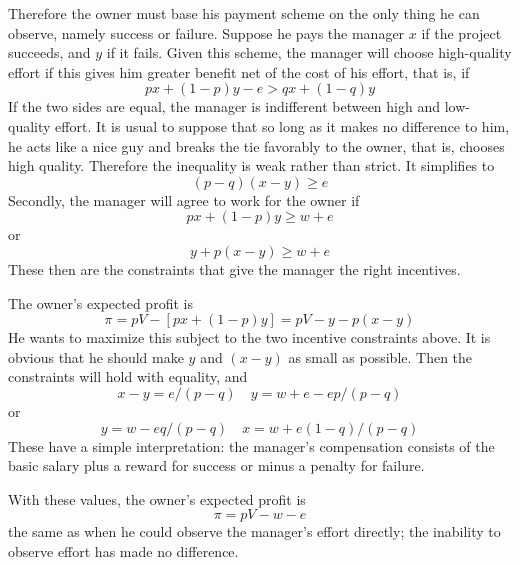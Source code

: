 Therefore the owner must base his payment scheme on the only thing he can observe, namely success or failure. Suppose he pays the manager $x$ if the project succeeds, and $y$ if it fails. Given this scheme, the manager will choose high-quality effort if this gives him greater benefit net of the cost of his effort, that is, if 
\begin{equation*}
px + (1-p)y -e > qx + (1-q)y 
\end{equation*}
If the two sides are equal, the manager is indifferent between high and low-quality effort. It is usual to suppose that so long as it makes no difference to him, he acts like a nice guy and breaks the tie favorably to the owner, that is, chooses high quality. Therefore the inequality is weak rather than strict. It simplifies to 
\begin{equation} \label{equa9.17}
(p-q) (x-y) \geq e
\end{equation}
Secondly, the manager will agree to work for the owner if 
\begin{equation*}
px + (1-p)y \geq w + e
\end{equation*}
or 
\begin{equation} \label{equa9.18}
 y + p(x-y) \geq w+e
\end{equation}
These then are the constraints that give the manager the right incentives.

The owner's expected profit is 
\begin{equation} \label{equa9.19}
\pi = pV - [  px + (1-p)y  ] = pV -y -p(x-y)
\end{equation}
He wants to maximize this subject to the two incentive constraints above. It is obvious that he should make $y$ and $(x-y)$ as small as possible. Then the constraints will hold with equality, and 
\begin{equation*} 
 x-y = e/(p-q) \quad y =w+e - ep/(p-q)
\end{equation*}
or
\begin{equation} \label{equa9.20}
 y = w -e q/(p-q) \quad  x = w +e (1-q)/(p-q)
\end{equation}
These have a simple interpretation: the manager's compensation consists of the basic salary plus a reward for success or minus a penalty for failure.

With these values, the owner's expected profit is
\begin{equation*} 
\pi = pV - w-e
\end{equation*}
the same as when he could observe the manager's effort directly; the inability to observe effort has made no difference.

